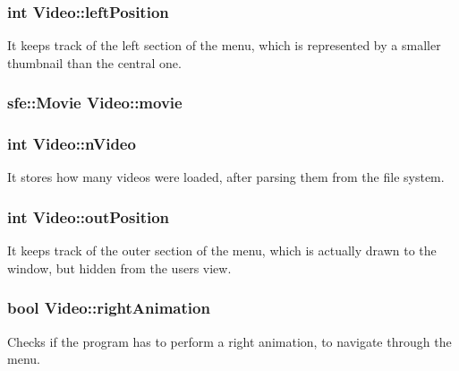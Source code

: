 \subsubsection[{\texorpdfstring{left\+Position}{leftPosition}}]{\setlength{\rightskip}{0pt plus 5cm}int Video\+::left\+Position\hspace{0.3cm}{\ttfamily [private]}}\hypertarget{classVideo_aae5cccd35042dd9947906c0d25d1d6ca}{}\label{classVideo_aae5cccd35042dd9947906c0d25d1d6ca}
It keeps track of the left section of the menu, which is represented by a smaller thumbnail than the central one. 
\subsubsection[{\texorpdfstring{movie}{movie}}]{\setlength{\rightskip}{0pt plus 5cm}sfe\+::\+Movie Video\+::movie\hspace{0.3cm}{\ttfamily [private]}}\hypertarget{classVideo_a7caa629bcd7defde560543a16fda097d}{}\label{classVideo_a7caa629bcd7defde560543a16fda097d}
\subsubsection[{\texorpdfstring{n\+Video}{nVideo}}]{\setlength{\rightskip}{0pt plus 5cm}int Video\+::n\+Video\hspace{0.3cm}{\ttfamily [private]}}\hypertarget{classVideo_abeb02719d0e789cc53428317c1d8cb51}{}\label{classVideo_abeb02719d0e789cc53428317c1d8cb51}
It stores how many videos were loaded, after parsing them from the file system. 
\subsubsection[{\texorpdfstring{out\+Position}{outPosition}}]{\setlength{\rightskip}{0pt plus 5cm}int Video\+::out\+Position\hspace{0.3cm}{\ttfamily [private]}}\hypertarget{classVideo_afa1d75f88328a80b477f2016dec95a10}{}\label{classVideo_afa1d75f88328a80b477f2016dec95a10}
It keeps track of the outer section of the menu, which is actually drawn to the window, but hidden from the user\textquotesingle{}s view. 
\subsubsection[{\texorpdfstring{right\+Animation}{rightAnimation}}]{\setlength{\rightskip}{0pt plus 5cm}bool Video\+::right\+Animation\hspace{0.3cm}{\ttfamily [private]}}\hypertarget{classVideo_ab61a504587371180bb6533ed99e1a688}{}\label{classVideo_ab61a504587371180bb6533ed99e1a688}
Checks if the program has to perform a right animation, to navigate through the menu. 

